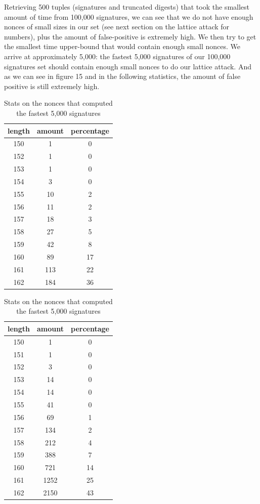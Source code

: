 \documentclass[a4paper,11pt]{article}
\begin{document}
Retrieving 500 tuples (signatures and truncated digests) that took the smallest amount of time from 100,000 signatures, we can see that we do not have enough nonces of small sizes in our set (see next section on the lattice attack for numbers), plus the amount of false-positive is extremely high. We then try to get the smallest time upper-bound that would contain enough small nonces. We arrive at approximately 5,000: the fastest 5,000 signatures of our 100,000 signatures set should contain enough small nonces to do our lattice attack. And as we can see in figure 15 and in the following statistics, the amount of false positive is still extremely high.

\begin{table}[H]
\parbox{.45\linewidth}{
\centering
\begin{tabular}{@{} *3c @{}}
\toprule
length&amount&percentage\\
\midrule
150  &   1   &    0\\
152  &   1  &     0\\
153  &   1  &     0\\
154  &   3  &     0\\
155  &   10  &    2\\
156  &   11  &    2\\
157   &  18  &    3\\
158  &   27 &     5\\
159  &   42 &     8\\
160  &   89  &    17\\
161  &   113 &    22\\
162  &   184 &    36\\
\bottomrule
\end{tabular}
\caption{Stats on the nonces that computed the fastest 500 signatures}
}
\hfill
\parbox{.45\linewidth}{
\centering
\begin{tabular}{@{} *3c @{}}
\toprule
length&amount&percentage\\
\midrule
150  &   1     &  0\\
151   &  1  &     0\\
152  &   3 &      0\\
153   &  14  &    0\\
154  &   14 &     0\\
155  &   41 &     0\\
156   &  69  &    1\\
157  &   134    & 2\\
158   &  212&     4\\
159   &  388 &    7\\
160  &   721 &    14\\
161  &   1252   & 25\\
162    & 2150 &   43\\
\bottomrule
\end{tabular}
\caption{Stats on the nonces that computed the fastest 5,000 signatures}
}
\end{table}
\end{document}
